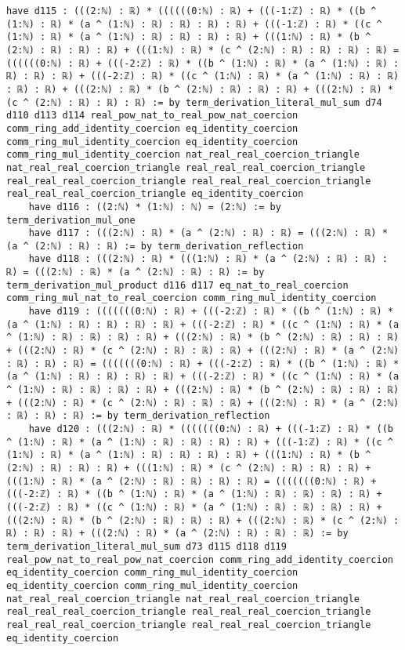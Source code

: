 \documentclass{article}
\begin{document}
\begin{tcolorbox}[colback=white!10, width=\linewidth]
\begin{lstlisting}[language=Lean4]
    have d115 : (((2:ℕ) : ℝ) * ((((((0:ℕ) : ℝ) + (((-1:ℤ) : ℝ) * ((b ^ (1:ℕ) : ℝ) * (a ^ (1:ℕ) : ℝ) : ℝ) : ℝ) : ℝ) + (((-1:ℤ) : ℝ) * ((c ^ (1:ℕ) : ℝ) * (a ^ (1:ℕ) : ℝ) : ℝ) : ℝ) : ℝ) + (((1:ℕ) : ℝ) * (b ^ (2:ℕ) : ℝ) : ℝ) : ℝ) + (((1:ℕ) : ℝ) * (c ^ (2:ℕ) : ℝ) : ℝ) : ℝ) : ℝ) = ((((((0:ℕ) : ℝ) + (((-2:ℤ) : ℝ) * ((b ^ (1:ℕ) : ℝ) * (a ^ (1:ℕ) : ℝ) : ℝ) : ℝ) : ℝ) + (((-2:ℤ) : ℝ) * ((c ^ (1:ℕ) : ℝ) * (a ^ (1:ℕ) : ℝ) : ℝ) : ℝ) : ℝ) + (((2:ℕ) : ℝ) * (b ^ (2:ℕ) : ℝ) : ℝ) : ℝ) + (((2:ℕ) : ℝ) * (c ^ (2:ℕ) : ℝ) : ℝ) : ℝ) := by term_derivation_literal_mul_sum d74 d110 d113 d114 real_pow_nat_to_real_pow_nat_coercion comm_ring_add_identity_coercion eq_identity_coercion comm_ring_mul_identity_coercion eq_identity_coercion comm_ring_mul_identity_coercion nat_real_real_coercion_triangle nat_real_real_coercion_triangle real_real_real_coercion_triangle real_real_real_coercion_triangle real_real_real_coercion_triangle real_real_real_coercion_triangle eq_identity_coercion
    have d116 : ((2:ℕ) * (1:ℕ) : ℕ) = (2:ℕ) := by term_derivation_mul_one
    have d117 : (((2:ℕ) : ℝ) * (a ^ (2:ℕ) : ℝ) : ℝ) = (((2:ℕ) : ℝ) * (a ^ (2:ℕ) : ℝ) : ℝ) := by term_derivation_reflection
    have d118 : (((2:ℕ) : ℝ) * (((1:ℕ) : ℝ) * (a ^ (2:ℕ) : ℝ) : ℝ) : ℝ) = (((2:ℕ) : ℝ) * (a ^ (2:ℕ) : ℝ) : ℝ) := by term_derivation_mul_product d116 d117 eq_nat_to_real_coercion comm_ring_mul_nat_to_real_coercion comm_ring_mul_identity_coercion
    have d119 : (((((((0:ℕ) : ℝ) + (((-2:ℤ) : ℝ) * ((b ^ (1:ℕ) : ℝ) * (a ^ (1:ℕ) : ℝ) : ℝ) : ℝ) : ℝ) + (((-2:ℤ) : ℝ) * ((c ^ (1:ℕ) : ℝ) * (a ^ (1:ℕ) : ℝ) : ℝ) : ℝ) : ℝ) + (((2:ℕ) : ℝ) * (b ^ (2:ℕ) : ℝ) : ℝ) : ℝ) + (((2:ℕ) : ℝ) * (c ^ (2:ℕ) : ℝ) : ℝ) : ℝ) + (((2:ℕ) : ℝ) * (a ^ (2:ℕ) : ℝ) : ℝ) : ℝ) = (((((((0:ℕ) : ℝ) + (((-2:ℤ) : ℝ) * ((b ^ (1:ℕ) : ℝ) * (a ^ (1:ℕ) : ℝ) : ℝ) : ℝ) : ℝ) + (((-2:ℤ) : ℝ) * ((c ^ (1:ℕ) : ℝ) * (a ^ (1:ℕ) : ℝ) : ℝ) : ℝ) : ℝ) + (((2:ℕ) : ℝ) * (b ^ (2:ℕ) : ℝ) : ℝ) : ℝ) + (((2:ℕ) : ℝ) * (c ^ (2:ℕ) : ℝ) : ℝ) : ℝ) + (((2:ℕ) : ℝ) * (a ^ (2:ℕ) : ℝ) : ℝ) : ℝ) := by term_derivation_reflection
    have d120 : (((2:ℕ) : ℝ) * (((((((0:ℕ) : ℝ) + (((-1:ℤ) : ℝ) * ((b ^ (1:ℕ) : ℝ) * (a ^ (1:ℕ) : ℝ) : ℝ) : ℝ) : ℝ) + (((-1:ℤ) : ℝ) * ((c ^ (1:ℕ) : ℝ) * (a ^ (1:ℕ) : ℝ) : ℝ) : ℝ) : ℝ) + (((1:ℕ) : ℝ) * (b ^ (2:ℕ) : ℝ) : ℝ) : ℝ) + (((1:ℕ) : ℝ) * (c ^ (2:ℕ) : ℝ) : ℝ) : ℝ) + (((1:ℕ) : ℝ) * (a ^ (2:ℕ) : ℝ) : ℝ) : ℝ) : ℝ) = (((((((0:ℕ) : ℝ) + (((-2:ℤ) : ℝ) * ((b ^ (1:ℕ) : ℝ) * (a ^ (1:ℕ) : ℝ) : ℝ) : ℝ) : ℝ) + (((-2:ℤ) : ℝ) * ((c ^ (1:ℕ) : ℝ) * (a ^ (1:ℕ) : ℝ) : ℝ) : ℝ) : ℝ) + (((2:ℕ) : ℝ) * (b ^ (2:ℕ) : ℝ) : ℝ) : ℝ) + (((2:ℕ) : ℝ) * (c ^ (2:ℕ) : ℝ) : ℝ) : ℝ) + (((2:ℕ) : ℝ) * (a ^ (2:ℕ) : ℝ) : ℝ) : ℝ) := by term_derivation_literal_mul_sum d73 d115 d118 d119 real_pow_nat_to_real_pow_nat_coercion comm_ring_add_identity_coercion eq_identity_coercion comm_ring_mul_identity_coercion eq_identity_coercion comm_ring_mul_identity_coercion nat_real_real_coercion_triangle nat_real_real_coercion_triangle real_real_real_coercion_triangle real_real_real_coercion_triangle real_real_real_coercion_triangle real_real_real_coercion_triangle eq_identity_coercion

\end{lstlisting}
\end{tcolorbox}
\end{document}
